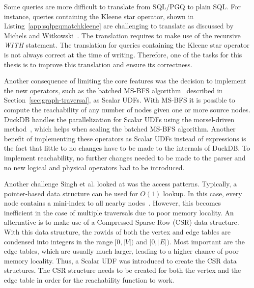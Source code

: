 Some queries are more difficult to translate from SQL/PGQ to plain SQL. 
For instance, queries containing the Kleene star operator, shown in Listing~\ref{app:sqlpgqmatchkleene} are challenging to translate as discussed by Michels and Witkowski~\cite{oracle-sql-example}. The translation requires to make use of the recursive \textit{WITH} statement.
The translation for queries containing the Kleene star operator is not always correct at the time of writing. 
Therefore, one of the tasks for this thesis is to improve this translation and ensure its correctness. 

Another consequence of limiting the core features was the decision to implement the new operators, such as the batched MS-BFS algorithm~\cite{10.14778/2735496.2735507} described in Section~\ref{sec:graph-traversal}, as Scalar UDFs. 
With MS-BFS it is possible to compute the reachability of any number of nodes given one or more source nodes. 
DuckDB handles the parallelization for Scalar UDFs using the morsel-driven method~\cite{duckdb-morsel-driven}, which helps when scaling the batched MS-BFS algorithm.
Another benefit of implementing these operators as Scalar UDFs instead of expressions is the fact that little to no changes have to be made to the internals of DuckDB. 
To implement reachability, no further changes needed to be made to the parser and no new logical and physical operators had to be introduced. 

Another challenge Singh et al. looked at was the access patterns. 
Typically, a pointer-based data structure can be used for $O(1)$ lookup. 
In this case, every node contains a mini-index to all nearby nodes~\cite{indexfreeadjacency}. 
However, this becomes inefficient in the case of multiple traversals due to poor memory locality. 
An alternative is to make use of a Compressed Sparse Row (CSR) data structure.
With this data structure, the rowids of both the vertex and edge tables are condensed into integers in the range  $[0, |V|)$ and $[0, |E|)$.  
Most important are the edge tables, which are usually much larger, leading to a higher chance of poor memory locality. 
Thus, a Scalar UDF was introduced to create the CSR data structures. The CSR structure needs to be created for both the vertex and the edge table in order for the reachability function to work.   

